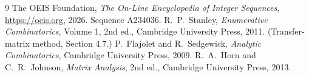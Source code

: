 \documentclass[11pt,a4paper]{article}
\theoremstyle{plain}
\theoremstyle{definition}
\begin{document}
\begin{thebibliography}{9}
 The OEIS Foundation, \emph{The On-Line Encyclopedia of Integer
Sequences}, \url{https://oeis.org}, 2026. Sequence A234036.
 R.~P.~Stanley, \emph{Enumerative Combinatorics}, Volume 1, 2nd ed.,
Cambridge University Press, 2011. (Transfer-matrix method, Section 4.7.)
 P.~Flajolet and R.~Sedgewick, \emph{Analytic Combinatorics}, Cambridge
University Press, 2009.
 R.~A.~Horn and C.~R.~Johnson, \emph{Matrix Analysis}, 2nd ed., Cambridge
University Press, 2013.
\end{thebibliography}
\end{document}
